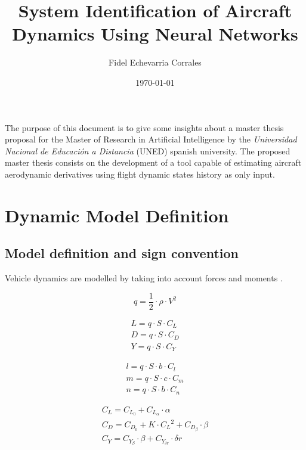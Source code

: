 \documentclass[12pt]{article}
\title{System Identification of Aircraft Dynamics Using Neural Networks}
\author{Fidel Echevarria Corrales}
\date{\today}
\begin{document}
\maketitle

The purpose of this document is to give some insights about a master thesis proposal for the Master of Research in Artificial Intelligence by the \textit{Universidad Nacional de Educación a Distancia} (UNED) spanish university. The proposed master thesis consists on the development of a tool capable of estimating aircraft aerodynamic derivatives using flight dynamic states history as only input.

\section{Dynamic Model Definition}

\subsection{Model definition and sign convention}

Vehicle dynamics are modelled by taking into account forces and moments \cite{Stevens2003}.

\begin{equation}\label{eq1}
    q=\frac{1}{2} \cdot \rho \cdot V^2
\end{equation}

\begin{equation}\label{eq2}
\begin{gathered}
    L=q \cdot S \cdot C_L \\
    D=q \cdot S \cdot C_D \\
    Y=q \cdot S \cdot C_Y
\end{gathered}
\end{equation}

\begin{equation}\label{eq2}
\begin{gathered}
    l=q \cdot S \cdot b \cdot C_l \\
    m=q \cdot S \cdot c \cdot C_m \\
    n=q \cdot S \cdot b \cdot C_n
\end{gathered}
\end{equation}

\begin{equation}\label{eq2}
\begin{gathered}
    C_L=C_{L_0} + C_{L_{\alpha}} \cdot \alpha \\
    C_D=C_{D_0} + K \cdot {C_L}^2 + C_{D_{\beta}} \cdot \beta \\
    C_Y=C_{Y_{\beta}} \cdot \beta + C_{Y_{\delta r}} \cdot \delta r
\end{gathered}
\end{equation}
\end{document}
